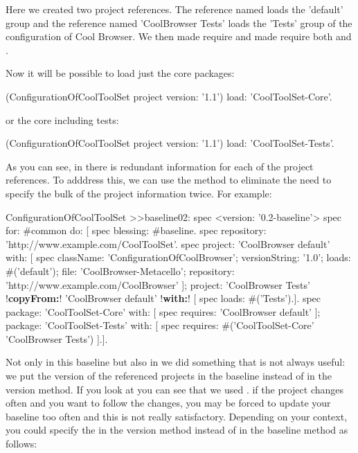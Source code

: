 \documentclass[a4paper,10pt,twoside]{book}
\begin{document}
Here we created two project references. The reference named  loads the 'default' group and the reference named 'CoolBrowser Tests'  loads the 'Tests' group of the configuration of Cool Browser. We then made  require  and made  require both  and .

Now it will be possible to load just the core packages:

\begin{code}{}
(ConfigurationOfCoolToolSet project version: '1.1') load: 'CoolToolSet-Core'.
\end{code} 
or the core including tests:
 
\begin{code}{}
  (ConfigurationOfCoolToolSet project version: '1.1') load: 'CoolToolSet-Tests'.
\end{code}

As you can see, in  there is redundant information for each of the project references. To adddress this, we can use the  method to eliminate the need to specify the bulk of the project information twice. For example:

\begin{code}{}
ConfigurationOfCoolToolSet >>baseline02: spec 
	<version: '0.2-baseline'>
	spec for: #common do: [
		spec blessing: #baseline.
		spec repository: 'http://www.example.com/CoolToolSet'.
		spec project: 'CoolBrowser default' with: [
				spec
					className: 'ConfigurationOfCoolBrowser';
					versionString: '1.0';
					loads: #('default');
					file: 'CoolBrowser-Metacello';
					repository: 'http://www.example.com/CoolBrowser' ];
			project: 'CoolBrowser Tests' 
				!\textbf{copyFrom:}! 'CoolBrowser default' 
				!\textbf{with:}! [ spec loads: #('Tests').].
		spec 
			package: 'CoolToolSet-Core' with: [ spec requires: 'CoolBrowser default' ];
			package: 'CoolToolSet-Tests' with: [ 
				spec requires: #('CoolToolSet-Core' 'CoolBrowser Tests') ].].					
\end{code}

Not only in this baseline but also in  we did something that is not always useful: we put the version of the referenced projects in the baseline instead of in the version method. If you look at  you can see that we used . if the project changes often and you want to follow the changes, you may be forced to update your baseline too often and this is not really satisfactory. Depending on your context, you could specify the  in the version method instead of in the baseline method as follows: 
\end{document}
